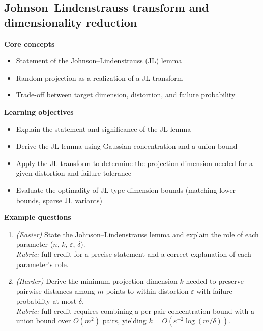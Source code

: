 \documentclass[11pt]{article}
\begin{document}
\subsection{Johnson--Lindenstrauss transform and dimensionality reduction}
\textbf{Core concepts}
\begin{itemize}[nosep]
\item Statement of the Johnson--Lindenstrauss (JL) lemma
\item Random projection as a realization of a JL transform
\item Trade-off between target dimension, distortion, and failure probability
\end{itemize}
\textbf{Learning objectives}
\begin{itemize}[nosep]
\item Explain the statement and significance of the JL lemma
\item Derive the JL lemma using Gaussian concentration and a union bound
\item Apply the JL transform to determine the projection dimension needed for a given distortion and failure tolerance
\item Evaluate the optimality of JL-type dimension bounds (matching lower bounds, sparse JL variants)
\end{itemize}
\textbf{Example questions}
\begin{enumerate}[nosep]
\item \emph{(Easier)} State the Johnson--Lindenstrauss lemma and explain the role of each parameter ($n$, $k$, $\varepsilon$, $\delta$). \\
\emph{Rubric:} full credit for a precise statement and a correct explanation of each parameter's role.
\item \emph{(Harder)} Derive the minimum projection dimension $k$ needed to preserve pairwise distances among $m$ points to within distortion $\varepsilon$ with failure probability at most $\delta$. \\
\emph{Rubric:} full credit requires combining a per-pair concentration bound with a union bound over $O(m^2)$ pairs, yielding $k = O(\varepsilon^{-2}\log(m/\delta))$.
\end{enumerate}
\end{document}
